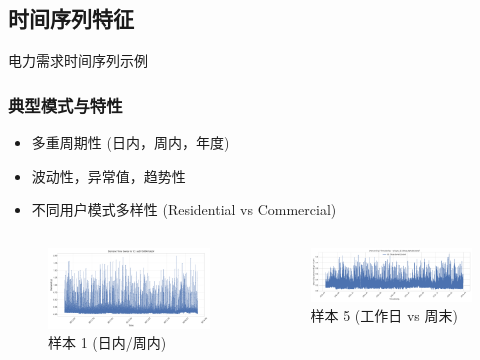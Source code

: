\documentclass{beamer} %
\begin{document}
\subsection{时间序列特征} %
\begin{frame}{电力需求时间序列示例}
    \frametitle{典型模式与特性}
    \begin{itemize}
        \item 多重周期性 (日内，周内，年度)
        \item 波动性，异常值，趋势性
        \item 不同用户模式多样性 (Residential vs Commercial)
    \end{itemize}
    \begin{columns}
        \begin{column}{0.48\textwidth}
            \centering
            \begin{figure}
                \includegraphics[width=\textwidth]{../plots/timeseries_sample_aab1f0df961afebf.png}
                \caption{样本 1 (日内/周内)}
            \end{figure}
        \end{column}
        \begin{column}{0.48\textwidth}
            \centering
            \begin{figure}
                \includegraphics[width=\textwidth]{../plots/timeseries_sample_58aac6a4a032e6af.png}
                \caption{样本 5 (工作日 vs 周末)}
            \end{figure}
        \end{column}
    \end{columns}
\end{frame}
\end{document}
